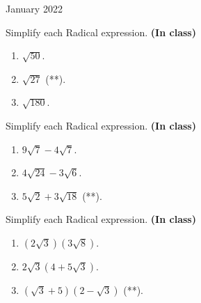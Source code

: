 \documentclass[12pt,oneside]{book} %
\begin{document}
\begin{lec}{January 2022}
  \begin{ex}
    Simplify each Radical expression. \textbf{(In class)}
    \begin{enumerate}[label=(\alph*)]
      \item $\sqrt{50} $.
      \item $\sqrt{27} $  \hfill (**).
      \item $\sqrt{180} $.
    \end{enumerate}
  \end{ex}

  \begin{ex}
    Simplify each Radical expression. \textbf{(In class)}
    \begin{enumerate}[label=(\alph*)]
      \item $9\sqrt{7} - 4\sqrt{7}$.
      \item $4\sqrt{24} -3\sqrt{6}$.
      \item $5\sqrt{2}  + 3\sqrt{18}$  \hfill (**).
    \end{enumerate}
  \end{ex}

  \begin{ex}
    Simplify each Radical expression. \textbf{(In class)}
    \begin{enumerate}[label=(\alph*)]
      \item $\left(2\sqrt{3}\right)\left(3\sqrt{8}\right)$.
      \item $2\sqrt{3} \left(4 + 5\sqrt{3} \right)$.
      \item $\left(\sqrt{3} + 5\right)\left(2 -\sqrt{3} \right)$  \hfill (**).
    \end{enumerate}
  \end{ex}
  

	\end{lec}
\end{document}
